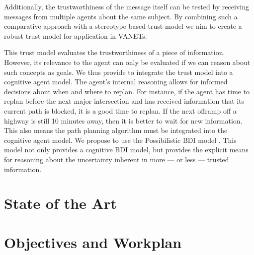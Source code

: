 \documentclass{article}
\begin{document}
Additionally, the trustworthiness of the message itself can be tested by receiving messages from multiple agents about the same subject. By combining such a comparative approach with a stereotype based trust model we aim to create a robust trust model for application in VANETs.

This trust model evaluates the trustworthiness of a piece of information. However, its relevance to the agent can only be evaluated if we can reason about such concepts as goals. We thus provide to integrate the trust model into a cognitive agent model. The agent's internal reasoning allows for informed decisions about when and where to replan. For instance, if the agent has time to replan before the next major intersection and has received information that its current path is blocked, it is a good time to replan. If the next offramp off a highway is still 10 minutes away, then it is better to wait for new information. This also means the path planning algorithm must be integrated into the cognitive agent model. We propose to use the Possibilistic BDI model \cite{CostaPerreira2010}. This model not only provides a cognitive BDI model, but provides the explicit means for reasoning about the uncertainty inherent in more --- or less --- trusted information.



\section{State of the Art}
\section{Objectives and Workplan}



\end{document}
